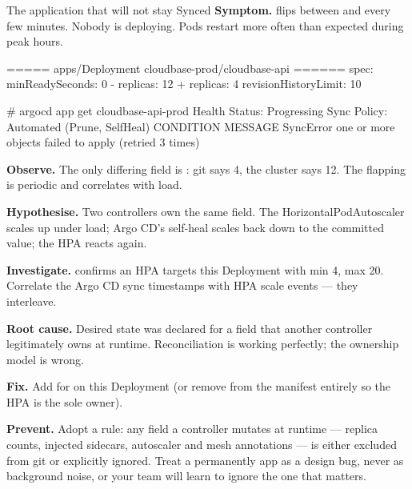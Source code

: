 \begin{debuglab}{The application that will not stay Synced}
\textbf{Symptom.}  flips between  and  every few minutes. Nobody is deploying. Pods restart more often than expected during peak hours.

\begin{outbox}
===== apps/Deployment cloudbase-prod/cloudbase-api ======
  spec:
    minReadySeconds: 0
-   replicas: 12
+   replicas: 4
    revisionHistoryLimit: 10

# argocd app get cloudbase-api-prod
Health Status:  Progressing
Sync Policy:    Automated (Prune, SelfHeal)
CONDITION       MESSAGE
SyncError       one or more objects failed to apply (retried 3 times)
\end{outbox}

\begin{tickcheck}
  \item \textbf{Observe.} The only differing field is : git says 4, the cluster says 12. The flapping is periodic and correlates with load.
  \item \textbf{Hypothesise.} Two controllers own the same field. The HorizontalPodAutoscaler scales up under load; Argo CD's self-heal scales back down to the committed value; the HPA reacts again.
  \item \textbf{Investigate.}  confirms an HPA targets this Deployment with min 4, max 20. Correlate the Argo CD sync timestamps with HPA scale events --- they interleave.
  \item \textbf{Root cause.} Desired state was declared for a field that another controller legitimately owns at runtime. Reconciliation is working perfectly; the ownership model is wrong.
  \item \textbf{Fix.} Add  for  on this Deployment (or remove  from the manifest entirely so the HPA is the sole owner).
  \item \textbf{Prevent.} Adopt a rule: any field a controller mutates at runtime --- replica counts, injected sidecars, autoscaler and mesh annotations --- is either excluded from git or explicitly ignored. Treat a permanently  app as a design bug, never as background noise, or your team will learn to ignore the one that matters.
\end{tickcheck}
\end{debuglab}

